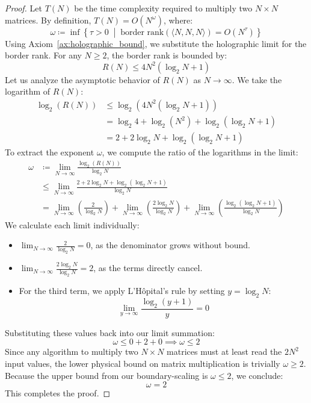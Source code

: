 \documentclass[11pt,a4paper]{book}
\begin{document}
\begin{proof}
Let $T(N)$ be the time complexity required to multiply two $N \times N$ matrices. 
By definition, $T(N) = O(N^\omega)$, where:
\begin{equation}
\label{eq:omega_infimum}
\omega \coloneqq \inf \left\{ \tau > 0 \;\middle|\; \text{border rank}(\langle N,N,N \rangle) = O(N^\tau) \right\}
\end{equation}
Using Axiom~\ref{ax:holographic_bound}, we substitute the holographic limit for the border rank. 
For any $N \ge 2$, the border rank is bounded by:
\begin{equation}
R(N) \le 4 N^2 \left( \log_2 N + 1 \right)
\end{equation}
Let us analyze the asymptotic behavior of $R(N)$ as $N \to \infty$. 
We take the logarithm of $R(N)$:
\begin{align}
\log_2 (R(N)) &\le \log_2 \left( 4 N^2 ( \log_2 N + 1 ) \right) \nonumber \\
&= \log_2 4 + \log_2 (N^2) + \log_2 (\log_2 N + 1) \nonumber \\
&= 2 + 2\log_2 N + \log_2 (\log_2 N + 1)
\end{align}
To extract the exponent $\omega$, we compute the ratio of the logarithms in the limit:
\begin{align}
\omega &\coloneqq \lim_{N \to \infty} \frac{\log_2(R(N))}{\log_2 N} \nonumber \\
&\le \lim_{N \to \infty} \frac{2 + 2\log_2 N + \log_2( \log_2 N + 1)}{\log_2 N} \nonumber \\
&= \lim_{N \to \infty} \left( \frac{2}{\log_2 N} \right) + \lim_{N \to \infty} \left( \frac{2\log_2 N}{\log_2 N} \right) + \lim_{N \to \infty} \left( \frac{\log_2(\log_2 N + 1)}{\log_2 N} \right)
\end{align}
We calculate each limit individually:
\begin{itemize}
    \item $\lim_{N \to \infty} \frac{2}{\log_2 N} = 0$, as the denominator grows without bound.
    \item $\lim_{N \to \infty} \frac{2\log_2 N}{\log_2 N} = 2$, as the terms directly cancel.
    \item For the third term, we apply L'H\^{o}pital's rule by setting $y = \log_2 N$:
    \begin{equation}
    \lim_{y \to \infty} \frac{\log_2(y + 1)}{y} = 0
    \end{equation}
\end{itemize}
Substituting these values back into our limit summation:
\begin{equation}
\omega \le 0 + 2 + 0 \implies \omega \le 2
\end{equation}
Since any algorithm to multiply two $N \times N$ matrices must at least read the $2N^2$ input values, the lower physical bound on matrix multiplication is trivially $\omega \ge 2$. 
Because the upper bound from our boundary-scaling is $\omega \le 2$, we conclude:
\begin{equation}
\omega = 2
\end{equation}
This completes the proof.
\end{proof}
\end{document}
